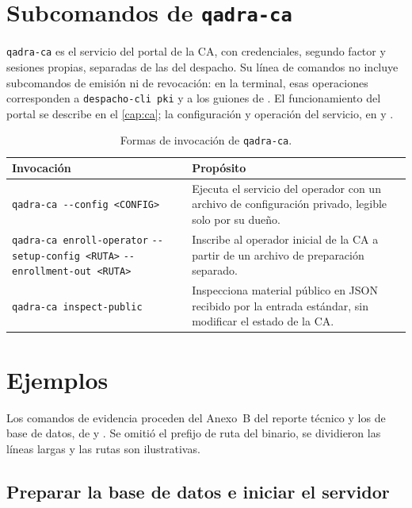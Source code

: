 \section{Subcomandos de \texttt{qadra-ca}}\label{sec:cli-qadra-ca}

\texttt{qadra-ca} es el servicio del portal de la CA, con credenciales,
segundo factor y sesiones propias, separadas de las del despacho. Su línea de
comandos no incluye subcomandos de emisión ni de revocación: en la terminal, esas
operaciones corresponden a \texttt{despacho-cli pki} y a los guiones de
. El funcionamiento del portal se describe en el \cref{cap:ca};
la configuración y operación del servicio, en  y
.

\begin{table}[H]
  \centering
  \caption{Formas de invocación de \texttt{qadra-ca}.}\label{tab:cli-qadra-ca}
  \begin{tabularx}{\textwidth}{L{6.2cm} Y}
    \toprule
    \textbf{Invocación} & \textbf{Propósito} \\
    \midrule
    \texttt{qadra-ca -{}-config <CONFIG>}
      & Ejecuta el servicio del operador con un archivo de configuración
        privado, legible solo por su dueño. \\
    \texttt{qadra-ca enroll-operator} \texttt{-{}-setup-config <RUTA>}
      \texttt{-{}-enrollment-out <RUTA>}
      & Inscribe al operador inicial de la CA a partir de un archivo de
        preparación separado. \\
    \texttt{qadra-ca inspect-public}
      & Inspecciona material público en JSON recibido por la entrada
        estándar, sin modificar el estado de la CA. \\
    \bottomrule
  \end{tabularx}
\end{table}

\section{Ejemplos}\label{sec:cli-ejemplos}

Los comandos de evidencia proceden del Anexo~B del reporte técnico y los de base
de datos, de  y
. Se omitió el prefijo de ruta del
binario, se dividieron las líneas largas y las rutas son ilustrativas.

\subsection{Preparar la base de datos e iniciar el servidor}
\label{sec:cli-ej-servidor}


